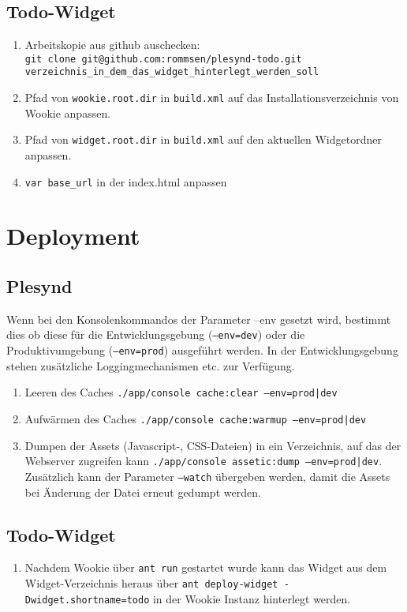 \subsection*{Todo-Widget}
\begin{enumerate}
 \item Arbeitskopie aus github auschecken: \\
 \texttt{git clone git@github.com:rommsen/plesynd-todo.git}\\ 
 \texttt{verzeichnis\_in\_dem\_das\_widget\_hinterlegt\_werden\_soll}
 \item Pfad von \texttt{wookie.root.dir} in \texttt{build.xml} auf das Installationsverzeichnis von Wookie anpassen.
 \item Pfad von \texttt{widget.root.dir} in \texttt{build.xml} auf den aktuellen Widgetordner anpassen.
 \item \texttt{var base\_url} in der index.html anpassen
\end{enumerate}

\section*{Deployment}

\subsection*{Plesynd}
Wenn bei den Konsolenkommandos der Parameter --env gesetzt wird, bestimmt dies ob diese für die Entwicklungsgebung (\texttt{--env=dev}) oder die Produktivumgebung (\texttt{--env=prod}) ausgeführt werden. In der Entwicklungsgebung stehen zusätzliche Loggingmechanismen etc. zur Verfügung.
\begin{enumerate}
 \item Leeren des Caches \texttt{./app/console cache:clear --env=prod|dev}
 \item Aufwärmen des Caches \texttt{./app/console cache:warmup --env=prod|dev}
 \item Dumpen der Assets (Javascript-, CSS-Dateien) in ein Verzeichnis, auf das der Webserver zugreifen kann \texttt{./app/console assetic:dump --env=prod|dev}. Zusätzlich kann der Parameter \texttt{--watch} übergeben werden, damit die Assets bei Änderung der Datei erneut gedumpt werden.
\end{enumerate}

\subsection*{Todo-Widget}
\begin{enumerate}
 \item Nachdem Wookie über \texttt{ant run} gestartet wurde kann das Widget aus dem Widget-Verzeichnis heraus über \texttt{ant deploy-widget -Dwidget.shortname=todo} in der Wookie Instanz hinterlegt werden.
\end{enumerate}

